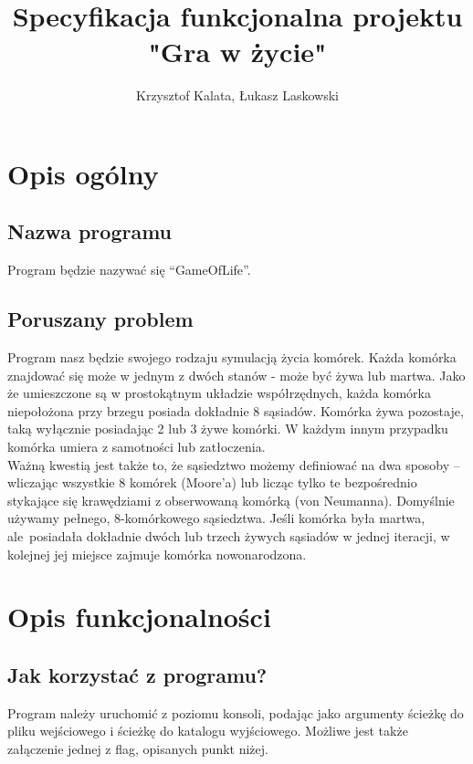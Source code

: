 \documentclass{article}
\title{Specyfikacja funkcjonalna projektu\\ "Gra w życie"}
\author{Krzysztof Kalata, Łukasz Laskowski}
\begin{document}
\maketitle

\tableofcontents
\newpage

\section{Opis ogólny}
\subsection{Nazwa programu}
Program będzie nazywać się “GameOfLife”.

\subsection{Poruszany problem}
Program nasz będzie swojego rodzaju symulacją życia komórek.
Każda komórka znajdować się może w jednym z dwóch stanów -
może być żywa lub martwa. Jako że umieszczone są w prostokątnym
układzie współrzędnych, każda komórka niepołożona przy brzegu posiada
dokładnie 8 sąsiadów. Komórka żywa pozostaje, taką wyłącznie posiadając
2 lub 3 żywe komórki. W każdym innym przypadku komórka umiera z
samotności lub zatłoczenia.\\
Ważną kwestią jest także to, że sąsiedztwo możemy definiować na dwa
sposoby -- wliczając wszystkie 8 komórek (Moore'a) lub licząc tylko te bezpośrednio
stykające się krawędziami z obserwowaną komórką (von Neumanna). Domyślnie używamy pełnego,
8-komórkowego sąsiedztwa.
Jeśli komórka była martwa,\\ ale~posiadała dokładnie dwóch lub trzech żywych
sąsiadów w jednej iteracji, w kolejnej jej miejsce zajmuje komórka
nowonarodzona.

\section{Opis funkcjonalności}
\subsection{Jak korzystać z programu?}
Program należy uruchomić z poziomu konsoli, podając jako argumenty ścieżkę
do pliku wejściowego i ścieżkę do katalogu wyjściowego. Możliwe jest także
załączenie jednej z flag, opisanych punkt niżej.
\end{document}
